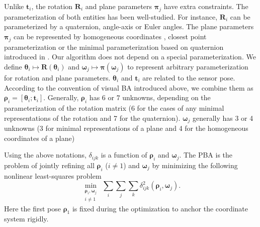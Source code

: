 \documentclass{vgtc}                          %
\begin{document}
Unlike $\mathbf{t}_i$, the rotation $\mathbf{R}_i$ and plane parameters $\bm{\pi}_j $ have extra constraints. The parameterization of both entities has been well-studied. For instance, $\mathbf{R}_i$ can be parameterized by a quaternion, angle-axis or Euler angles. The plane parameters $\bm{\pi}_j$ can be represented by homogeneous coordinates \cite{hartley2003multiple},  closest point parameterization \cite{yang2019tightly} or the minimal parameterization based on quaternion introduced in \cite{kaess2015simultaneous}. Our algorithm does not depend on  a special  parameterization. We define $\bm{\theta}_i \mapsto \mathbf{R}\left( \bm{\theta}_i\right) $ and $\bm{\omega}_j \mapsto \bm{\pi}\left( \bm{\omega}_j\right)$ to represent arbitrary  parameterization for rotation and plane parameters. $\bm{\theta}_i$ and  $\mathbf{t}_i$ are related to the sensor pose. According to the convention of   visual BA introduced above, we  combine them as $\bm{\rho}_i= \left[\bm{\theta}_i; \mathbf{t}_i \right]$.    Generally,  $\bm{\rho}_i$ has $6$ or $7$ unknowns,  depending on the parameterization of the rotation matrix (6 for  the cases of any minimal representations of  the rotation and 7 for the quaternion). $\bm{\omega}_{j}$  generally has 3 or  4 unknowns (3 for minimal representations of a  plane \cite{kaess2015simultaneous,yang2019tightly} and 4 for the  homogeneous coordinates of a plane\cite{hartley2003multiple})

Using the above notations, $\delta_{ijk}$ is a function of $\bm{\rho}_i$ and $ \bm{\omega}_j$. The PBA is the problem of jointly refining all $\bm{\rho}_i$ ($i \neq 1$) and $\bm{\omega}_j$ by minimizing the following nonlinear least-squares problem
\begin{equation} \label{equ_cost}
	\min_{\substack{\bm{\rho}_i, \bm{\omega}_ j  \\ i \neq 1}} \ \sum_{i}\sum_{j} \sum_{k}\delta_{ijk} ^2\left( \bm{\rho}_i,\bm{\omega}_j\right).
\end{equation}   
Here the first pose $\bm{\rho}_1$ is fixed  during the optimization to anchor the coordinate system rigidly.
\end{document}
